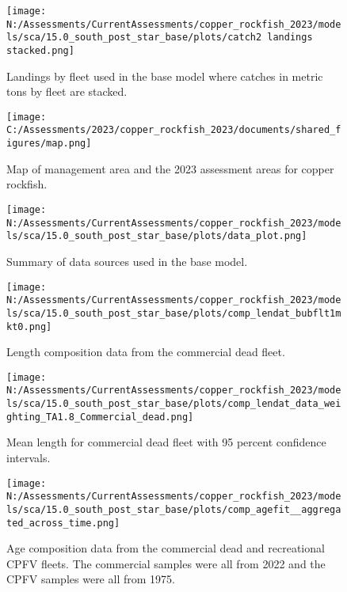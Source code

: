 \documentclass[11pt,
  english,
  letterpaper,
]{article}
\begin{document}
\pagebreak

\begin{figure}
\centering
\texttt{[image: N:/Assessments/CurrentAssessments/copper\_rockfish\_2023/models/sca/15.0\_south\_post\_star\_base/plots/catch2 landings stacked.png]}
\caption{Landings by fleet used in the base model where catches in metric tons by fleet are stacked.\label{fig:catch}}
\end{figure}

\pagebreak

\begin{figure}
\centering
\texttt{[image: C:/Assessments/2023/copper\_rockfish\_2023/documents/shared\_figures/map.png]}
\caption{Map of management area and the 2023 assessment areas for copper rockfish.\label{fig:ca-map}}
\end{figure}

\pagebreak

\begin{figure}
\centering
\texttt{[image: N:/Assessments/CurrentAssessments/copper\_rockfish\_2023/models/sca/15.0\_south\_post\_star\_base/plots/data\_plot.png]}
\caption{Summary of data sources used in the base model.\label{fig:data-plot}}
\end{figure}

\pagebreak

\begin{figure}
\centering
\texttt{[image: N:/Assessments/CurrentAssessments/copper\_rockfish\_2023/models/sca/15.0\_south\_post\_star\_base/plots/comp\_lendat\_bubflt1mkt0.png]}
\caption{Length composition data from the commercial dead fleet.\label{fig:com-dead-len-data}}
\end{figure}

\pagebreak

\begin{figure}
\centering
\texttt{[image: N:/Assessments/CurrentAssessments/copper\_rockfish\_2023/models/sca/15.0\_south\_post\_star\_base/plots/comp\_lendat\_data\_weighting\_TA1.8\_Commercial\_dead.png]}
\caption{Mean length for commercial dead fleet with 95 percent confidence intervals.\label{fig:mean-com-dead-len-data}}
\end{figure}

\pagebreak

\begin{figure}
\centering
\texttt{[image: N:/Assessments/CurrentAssessments/copper\_rockfish\_2023/models/sca/15.0\_south\_post\_star\_base/plots/comp\_agefit\_\_aggregated\_across\_time.png]}
\caption{Age composition data from the commercial dead and recreational CPFV fleets. The commercial samples were all from 2022 and the CPFV samples were all from 1975.\label{fig:com-dead-age-data}}
\end{figure}
\end{document}
